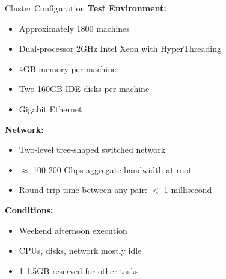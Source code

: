 \documentclass[aspectratio=169]{beamer}
\begin{document}
\begin{frame}{Cluster Configuration}
\textbf{Test Environment:}
\begin{itemize}
    \item Approximately 1800 machines
    \item Dual-processor 2GHz Intel Xeon with HyperThreading
    \item 4GB memory per machine
    \item Two 160GB IDE disks per machine
    \item Gigabit Ethernet
\end{itemize}

\vspace{0.3cm}

\textbf{Network:}
\begin{itemize}
    \item Two-level tree-shaped switched network
    \item $\approx$ 100-200 Gbps aggregate bandwidth at root
    \item Round-trip time between any pair: $<$ 1 millisecond
\end{itemize}

\vspace{0.3cm}

\textbf{Conditions:}
\begin{itemize}
    \item Weekend afternoon execution
    \item CPUs, disks, network mostly idle
    \item 1-1.5GB reserved for other tasks
\end{itemize}
\end{frame}
\end{document}

